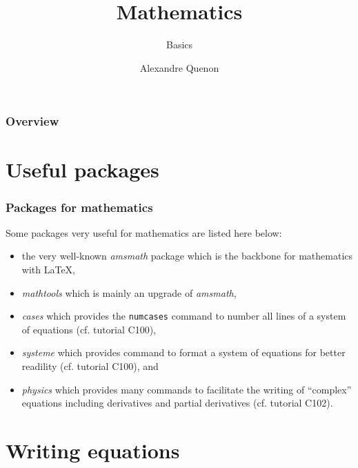 \documentclass[11pt]{beamer}
\title{Mathematics}
\subtitle{Basics}
\author[A. Quenon]{Alexandre Quenon}
\begin{document}
	
\begin{frame}
	\titlepage
\end{frame}


\begin{frame}
	\frametitle{Overview}
	
	\tableofcontents
\end{frame}


\section{Useful packages}

\begin{frame}
	\frametitle{Packages for mathematics}

	Some packages very useful for mathematics are listed here below:
	\begin{itemize}
		\item the very well-known \emph{amsmath} package which is the backbone for mathematics with \LaTeX{},
		\item \alert{\emph{mathtools}} which is mainly an upgrade of \emph{amsmath},
		\item \emph{cases} which provides the \texttt{numcases} command to number all lines of a system of equations (cf. tutorial C100),
		\item \emph{systeme} which provides command to format a system of equations for better readility (cf. tutorial C100), and
		\item \emph{physics} which provides many commands to facilitate the writing of \enquote{complex} equations including derivatives and partial derivatives (cf. tutorial C102).
	\end{itemize}
\end{frame}


\section{Writing equations}
\end{document}
